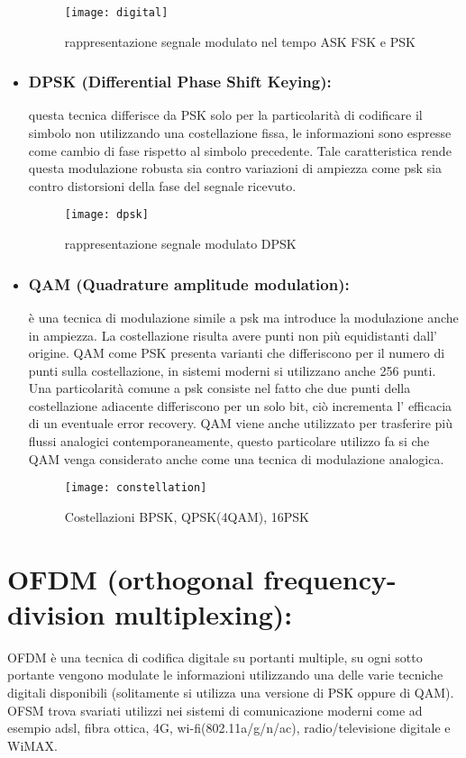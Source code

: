 \begin{itemize}
  \begin{figure}[h]
  	\centering
  	\texttt{[image: digital]}
  	\caption{rappresentazione segnale modulato nel tempo ASK FSK e PSK \cite{digit}}\label{fig:1}
  \end{figure}
  \item \subsection{DPSK (Differential Phase Shift Keying): } questa tecnica differisce da PSK solo per la particolarità di codificare il simbolo non utilizzando una costellazione fissa, le informazioni sono espresse come cambio di fase rispetto al simbolo precedente. Tale caratteristica rende questa modulazione robusta sia contro variazioni di ampiezza come psk sia contro distorsioni della fase del segnale ricevuto.
  \begin{figure}[h]
  	\centering
  	\texttt{[image: dpsk]}
  	\caption{rappresentazione segnale modulato DPSK \cite{dpsk}}\label{fig:1}
  \end{figure}
    
  \item \subsection{QAM (Quadrature amplitude modulation): } è una tecnica di modulazione simile a psk ma introduce la modulazione anche in ampiezza. La costellazione risulta avere punti non più equidistanti dall' origine. QAM come PSK presenta varianti che differiscono per il numero di punti sulla costellazione, in sistemi moderni si utilizzano anche 256 punti. Una particolarità comune a psk consiste nel fatto che due punti della costellazione adiacente differiscono per un solo bit, ciò incrementa l' efficacia di un eventuale error recovery. QAM viene anche utilizzato per trasferire più flussi analogici contemporaneamente, questo particolare utilizzo fa si che QAM venga considerato anche come una tecnica di modulazione analogica. 
  \cite{qam}
  
  \begin{figure}[h]
	\centering
	\texttt{[image: constellation]}
	\caption{Costellazioni BPSK, QPSK(4QAM), 16PSK \cite{psk-constellation}}\label{fig:1}
  \end{figure} 
  \end{itemize}


\chapter{OFDM (orthogonal frequency-division multiplexing): }
OFDM è una tecnica di codifica digitale su portanti multiple, su ogni sotto portante vengono modulate le informazioni utilizzando una delle varie tecniche digitali disponibili (solitamente si utilizza una versione di PSK oppure di QAM). OFSM trova svariati utilizzi nei sistemi di comunicazione moderni come ad esempio adsl, fibra ottica, 4G, wi-fi(802.11a/g/n/ac), radio/televisione digitale e WiMAX.
\cite{ofdm}
\cite{ofdm2}

